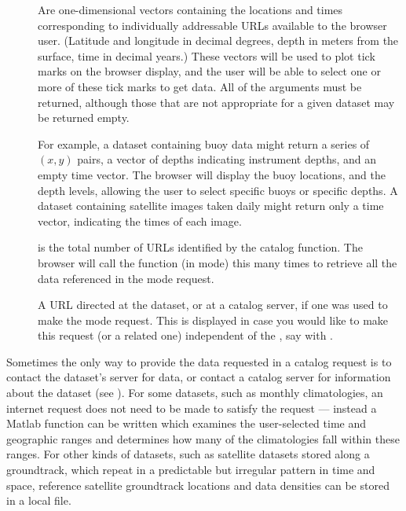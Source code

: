 \begin{description}
  
\item[] Are one-dimensional vectors containing the
  locations and times corresponding to individually addressable URLs
  available to the browser user.  (Latitude and longitude in decimal
  degrees, depth in meters from the surface, time in decimal years.)
  These vectors will be used to plot tick marks on the browser
  display, and the user will be able to select one or more of these
  tick marks to get data.  All of the arguments must be returned,
  although those that are not appropriate for a given dataset may be
  returned empty.
  
  For example, a dataset containing buoy data might return a series of
  $(x,y)$ pairs, a vector of depths indicating instrument depths, and
  an empty time vector.  The browser will display the buoy locations,
  and the depth levels, allowing the user to select specific buoys or
  specific depths.  A dataset containing satellite images taken daily
  might return only a time vector, indicating the times of each image.

\item[] is the total number of URLs identified by the catalog
  function.  The browser will call the  function (in
   mode) this many times to retrieve all the data referenced
  in the  mode request.
  
\item[] A URL directed at the dataset, or at a catalog
  server, if one was used to make the  mode request.  This is
  displayed in case you would like to make this request (or a related
  one) independent of the \GUI , say with .
\end{description}

Sometimes the only way to provide the data requested in a catalog
request is to contact the dataset's \opendap server for data, or contact a
catalog server for information about the dataset (see
).  For some datasets, such as monthly
climatologies, an internet request does not need to be made to satisfy
the request --- instead a Matlab function can be written which
examines the user-selected time and geographic ranges and determines
how many of the climatologies fall within these ranges.  For other
kinds of datasets, such as satellite datasets stored along a
groundtrack, which repeat in a predictable but irregular pattern in
time and space, reference satellite groundtrack locations and data
densities can be stored in a local  file. 

